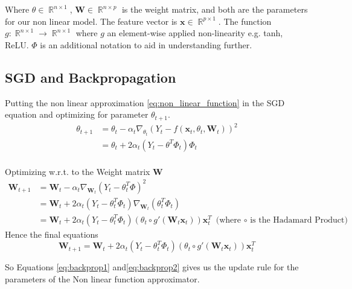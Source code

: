 \documentclass[twoside]{article}
\DeclareMathOperator{\real}{\mathbb{R}}
\begin{document}
Where $\theta \in \real^{n \times 1}$, $\textbf{W} \in \real^{n \times p}$ is the weight matrix, and both are the parameters for our non linear model. The feature vector is  $\textbf{x} \in \real^{p \times 1}$. The function $g : \real^{n \times 1} \rightarrow \real^{n \times 1}$ where $g$ an element-wise applied non-linearity e.g. tanh, ReLU.
$\Phi$ is an additional notation to aid in understanding further.
\subsection{SGD and Backpropagation }
Putting the non linear approximation  \ref{eq:non_linear_function} in the SGD equation and optimizing for parameter $\theta_{t+1}$.
\begin{equation}\label{eq:backprop1}
    \begin{split}
        \theta_{t+1} &= \theta_t - \alpha_t \nabla_{\theta_t}(Y_t - f(\textbf{x}_t, \theta_t, \textbf{W}_t))^2\\
        &= \theta_t + 2 \alpha_t (Y_t - \theta^T \Phi_t)\Phi_t\\
    \end{split}
\end{equation}

Optimizing w.r.t. to the Weight matrix $\textbf{W}$
\begin{equation}\label{der:weight_optimization_non_linear}
    \begin{split}
        \textbf{W}_{t+1} &= \textbf{W}_t - \alpha_t \nabla_{\textbf{W}_t}(Y_t - \theta_t^T\Phi)^2\\
        &= \textbf{W}_t + 2\alpha_t (Y_t - \theta_t^T\Phi_t)\nabla_{\textbf{W}_t} (\theta_t^T\Phi_t)\\
        &= \textbf{W}_t + 2\alpha_t (Y_t - \theta_t^T\Phi_t)(\theta_t \circ g'(\textbf{W}_t\textbf{x}_t))\textbf{x}_t^T \text{ (where $\circ$ is the Hadamard Product)}
    \end{split}
\end{equation}
Hence the final equations
\begin{equation}\label{eq:backprop2}
    \textbf{W}_{t+1} = \textbf{W}_t + 2\alpha_t (Y_t - \theta_t^T\Phi_t)(\theta_t \circ g'(\textbf{W}_t\textbf{x}_t))\textbf{x}_t^T
\end{equation}

So Equations \ref{eq:backprop1} and\ref{eq:backprop2} 
 gives us the update rule for the parameters of the Non linear function approximator.
 
 







\end{document}
